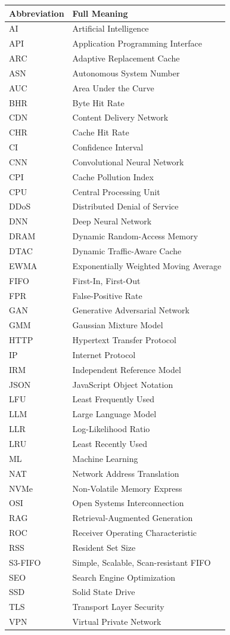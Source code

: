 \documentclass[12pt,a4paper]{report}
\begin{document}
\begin{longtable}{@{}ll}
\textbf{Abbreviation} & \textbf{Full Meaning} \\
\endhead
AI & Artificial Intelligence \\
API & Application Programming Interface \\
ARC & Adaptive Replacement Cache \\
ASN & Autonomous System Number \\
AUC & Area Under the Curve \\
BHR & Byte Hit Rate \\
CDN & Content Delivery Network \\
CHR & Cache Hit Rate \\
CI & Confidence Interval \\
CNN & Convolutional Neural Network \\
CPI & Cache Pollution Index \\
CPU & Central Processing Unit \\
DDoS & Distributed Denial of Service \\
DNN & Deep Neural Network \\
DRAM & Dynamic Random-Access Memory \\
DTAC & Dynamic Traffic-Aware Cache \\
EWMA & Exponentially Weighted Moving Average \\
FIFO & First-In, First-Out \\
FPR & False-Positive Rate \\
GAN & Generative Adversarial Network \\
GMM & Gaussian Mixture Model \\
HTTP & Hypertext Transfer Protocol \\
IP & Internet Protocol \\
IRM & Independent Reference Model \\
JSON & JavaScript Object Notation \\
LFU & Least Frequently Used \\
LLM & Large Language Model \\
LLR & Log-Likelihood Ratio \\
LRU & Least Recently Used \\
ML & Machine Learning \\
NAT & Network Address Translation \\
NVMe & Non-Volatile Memory Express \\
OSI & Open Systems Interconnection \\
RAG & Retrieval-Augmented Generation \\
ROC & Receiver Operating Characteristic \\
RSS & Resident Set Size \\
S3-FIFO & Simple, Scalable, Scan-resistant FIFO \\
SEO & Search Engine Optimization \\
SSD & Solid State Drive \\
TLS & Transport Layer Security \\
VPN & Virtual Private Network \\
\end{longtable}
\newpage
\end{document}

